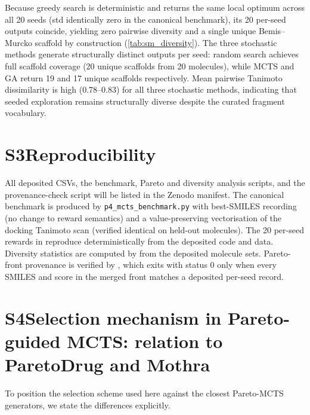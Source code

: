 \documentclass[10pt,a4paper]{article}
\begin{document}
Because greedy search is deterministic and returns the same local optimum across all \num{20} seeds
(std identically zero in the canonical benchmark), its \num{20} per-seed
outputs coincide, yielding zero pairwise diversity and a single unique
Bemis--Murcko scaffold by construction (\cref{tab:sm_diversity}). The
three stochastic methods generate structurally distinct outputs per seed:
random search achieves full scaffold coverage (\num{20} unique scaffolds from
\num{20} molecules), while MCTS and GA return \num{19} and \num{17} unique
scaffolds respectively. Mean pairwise Tanimoto dissimilarity is high
(\num{0.78}--\num{0.83}) for all three stochastic methods, indicating that
seeded exploration remains structurally diverse despite the curated fragment
vocabulary.

\section*{S3\hspace{0.6em}Reproducibility}

All deposited CSVs, the benchmark, Pareto and diversity analysis scripts, and
the provenance-check script will be listed in the Zenodo manifest. The canonical
benchmark is produced by \texttt{p4\_mcts\_benchmark.py} with best-SMILES
recording (no change to reward semantics) and a value-preserving vectorisation
of the docking Tanimoto scan (verified identical on held-out molecules). The
\num{20} per-seed rewards in
 reproduce
deterministically from the deposited code and data. Diversity statistics are
computed by  from the deposited molecule
sets. Pareto-front provenance is verified by
, which exits with status 0 only
when every SMILES and score in the merged front matches a deposited per-seed
record.

\section*{S4\hspace{0.6em}Selection mechanism in Pareto-guided MCTS: relation to ParetoDrug and Mothra}

To position the selection scheme used here against the closest Pareto-MCTS
generators, we state the differences explicitly.
\end{document}
